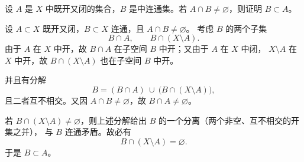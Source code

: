 \begin{homework}[4.4]
设 $A$ 是 $X$ 中既开又闭的集合，$B$ 是中连通集。若 $A \cap B \neq \varnothing$，则证明 $B \subset A$。
\end{homework}
\begin{solution}
设 $A\subset X$ 既开又闭，$B\subset X$ 连通，且 $A\cap B\neq\varnothing$。
考虑 $B$ 的两个子集
\[
B\cap A,\qquad B\cap (X\setminus A).
\]
由于 $A$ 在 $X$ 中开，故 $B\cap A$ 在子空间 $B$ 中开；又由于 $A$ 在 $X$ 中闭，
$X\setminus A$ 在 $X$ 中开，故 $B\cap (X\setminus A)$ 也在子空间 $B$ 中开。

并且有分解
\[
B=(B\cap A)\ \cup\ \bigl(B\cap (X\setminus A)\bigr),
\]
且二者互不相交。又因 $A\cap B\neq\varnothing$，故 $B\cap A\neq\varnothing$。

若 $B\cap (X\setminus A)\neq\varnothing$，则上述分解给出 $B$ 的一个分离（两个非空、互不相交的开集之并），
与 $B$ 连通矛盾。故必有
\[
B\cap (X\setminus A)=\varnothing.
\]
于是 $B\subset A$。
\end{solution}
